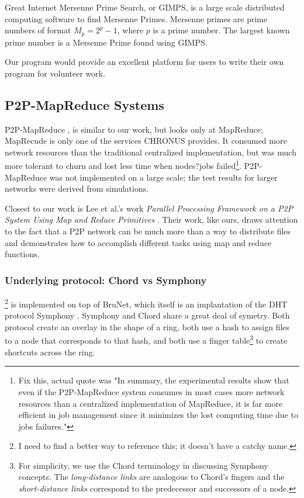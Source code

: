 \documentclass[conference, compsocconf, letterpaper]{IEEEtran}
\begin{document}
Great Internet  Mersenne Prime Search, or GIMPS, is a large scale distributed computing software to find Mersenne Primes.  Mersenne primes are prime numbers of format $M_{p} = 2^{p} - 1$, where $p$ is a prime number. The largest known prime number is a Mersenne Prime found using GIMPS.
 
 
Our program would provide an excellent platform for users to write their own program for volunteer work.  



\subsection{P2P-MapReduce Systems}

P2P-MapReduce \cite{marozzo2012p2p}, is similar to our work, but looks only at MapReduce; MapRecude is only one of the services CHRONUS provides.  It consumed more network resources than the traditional centralized implementation, but was much more tolerant to churn and lost less time when nodes?jobs failed\footnote{Fix this, actual quote was "In summary, the experimental results show that even if the P2P-MapReduce system consumes in most cases more network resources than a centralized implementation of MapReduce, it is far more efficient in job management since it minimizes the lost computing time due to jobs failures."}.  P2P-MapReduce was not implemented on a large scale; the test results for larger networks were derived from simulations.

Closest to our work is Lee et al.'s work \emph{Parallel Processing Framework on a P2P System Using Map and Reduce Primitives} \cite{leemap}.  Their work, like ours, draws attention to the fact that a P2P network can be much more than a way to distribute files and demonstrates how to accomplish different tasks using map and reduce functions. 

\subsubsection{Underlying protocol: Chord vs Symphony}

\cite{leemap}\footnote{I need to find a better way to reference this; it doesn't have a  catchy name.} is implemented on top of BruNet\cite{BruNet}, which itself is an implantation of the DHT protocol Symphony \cite{symphony}.  Symphony and Chord share a great deal of symetry.  Both protocol create an overlay in the shape of a ring, both  use a hash to assign files to a node that corresponds to that hash, and both use a finger table\footnote{For simplicity, we use the Chord terminology in discussing Symphony concepts. The \emph{long-distance links} are analogous to Chord's fingers and the \emph{short-distance links} correspond to the predecessor and successors of a node.} to create shortcuts across the ring.
\end{document}
